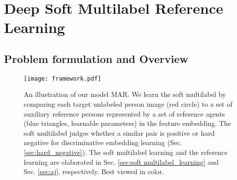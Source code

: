 \documentclass[10pt,twocolumn,letterpaper]{article}
\begin{document}
\section{Deep Soft Multilabel Reference Learning}

\subsection{Problem formulation and Overview}

\begin{figure*}[t]
\begin{center}
\texttt{[image: framework.pdf]}
\end{center}
\vspace{-0.2cm}
   \caption{An illustration of our model MAR.
   We learn the soft multilabel by comparing each target unlabeled person
   image  (red circle) to a set of auxiliary reference persons
   represented by a set of reference agents  (blue triangles, learnable parameters) in the feature embedding.
   The soft multilabel judges whether a similar pair is positive or hard negative for discriminative embedding learning (Sec. \ref{sec:hard_negative}).
   The soft multilabel learning and the reference learning are elaborated in Sec. \ref{sec:soft multilabel_learning} and Sec. \ref{sec:aj}, respectively.
   Best viewed in color.}
\vspace{-0.2cm}
\label{fig:framework}
\end{figure*}
\end{document}
